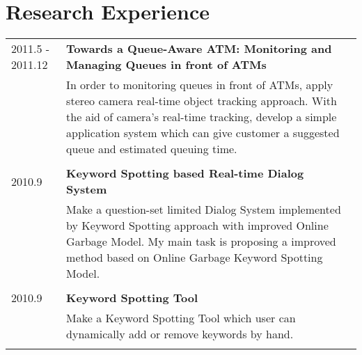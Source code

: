 \documentclass[10pt]{article}
\begin{document}
\newcommand{\ExpEntryS}[5]{
\textsc{#1} & \textbf{#2} #3 \textsc{#4}\\
\nopagebreak &\multicolumn{2}{p{5.5in}}{\small{#5}}\\
\nopagebreak \multicolumn{3}{c}{} \\ [-1ex]
}

\newcommand{\ExpEntryL}[5]{
\textsc{#1} & \textbf{#2} #3 \textsc{#4}\\
\nopagebreak &\multicolumn{2}{p{5.5in}}{\small{#5}}\\
}
\vspace{0.8em}
\section{Research Experience}
\setlength\LTleft{0pt}
\setlength\LTright{0pt}
\vspace{-0.5em}
\begin{longtable}{@{\extracolsep{\fill}} l | l r}

  \ExpEntryS{2011.5 - 2011.12}%
  {Towards a Queue-Aware ATM: Monitoring and Managing Queues in front of ATMs}%
  {}%
  {}%
  {In order to monitoring queues in front of ATMs, apply stereo camera real-time object tracking approach. With the aid of camera’s real-time tracking, develop a simple application system which can give customer a suggested queue and estimated queuing time.}

  \ExpEntryS{2010.9}%
  {Keyword Spotting based Real-time Dialog System}%
  {}%
  {}%
  {Make a question-set limited Dialog System implemented by Keyword Spotting approach with improved Online Garbage Model. My main task is proposing a improved method based on Online Garbage Keyword Spotting Model.}

  \ExpEntryS{2010.9}%
  {Keyword Spotting Tool}%
  {}%
  {}%
  {Make a Keyword Spotting Tool which user can dynamically add or remove keywords by hand.}
\end{longtable}





\newcommand{\SkillEntry}[2]{ \item #2 #1 }
\vspace{-0.5em}
\end{document}
